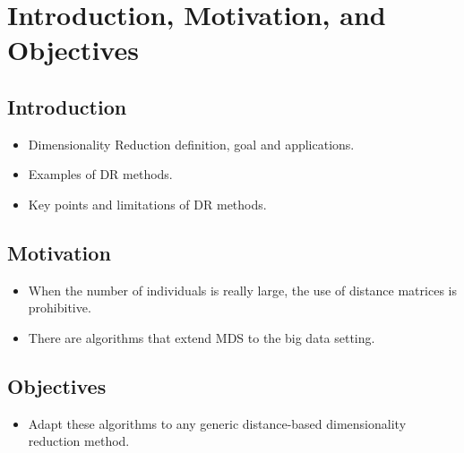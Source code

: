 \section{Introduction, Motivation, and Objectives}

\subsection{Introduction}

\begin{itemize}
    \item Dimensionality Reduction definition, goal and applications.
    \item Examples of DR methods.
    \item Key points and limitations of DR methods.
\end{itemize}

\subsection{Motivation}

\begin{itemize}
    \item When the number of individuals is really large, the use of distance matrices is prohibitive.
    \item There are algorithms that extend MDS to the big data setting.
\end{itemize}

\subsection{Objectives}

\begin{itemize}
    \item Adapt these algorithms to any generic distance-based dimensionality reduction method.
\end{itemize}